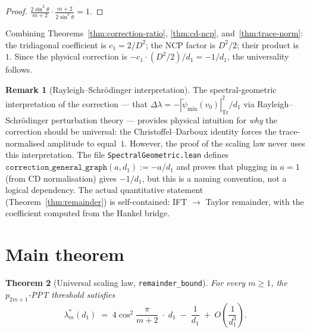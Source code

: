 \documentclass[11pt,a4paper]{article}
\theoremstyle{plain}
\newtheorem{theorem}{Theorem}[section]
\theoremstyle{definition}
\newtheorem{remark}[theorem]{Remark}
\newcommand{\Dsq}{D^2}
\newcommand{\lean}[1]{\texttt{#1}}
\begin{document}
\begin{proof}
$\frac{2\sin^2\theta}{m+2} \cdot \frac{m+2}{2\sin^2\theta} = 1$.
\end{proof}

Combining Theorems~\ref{thm:correction-ratio},
\ref{thm:cd-ncp}, and~\ref{thm:trace-norm}:
the tridiagonal coefficient is $c_1 = 2/\Dsq$;
the NCP factor is $\Dsq/2$;
their product is~$1$.  Since the physical correction is
$-c_1 \cdot (\Dsq/2) / d_1 = -1/d_1$,
the universality follows.

\begin{remark}[Rayleigh--Schr\"odinger interpretation]
\label{rem:RS}
The spectral-geometric interpretation of the correction ---
that $\Delta\lambda = -|\tilde\psi_{\min}(v_0)|^2_{\mathrm{Tr}}/d_1$
via Rayleigh--Schr\"odinger perturbation theory --- provides
physical intuition for \emph{why} the correction should be
universal: the Christoffel--Darboux identity forces the
trace-normalised amplitude to equal~$1$.
However, the proof of the scaling law never uses this
interpretation.  The file \lean{SpectralGeometric.lean}
defines $\lean{correction\_general\_graph}(a, d_1) := -a/d_1$
and proves that plugging in $a = 1$ (from CD normalisation)
gives $-1/d_1$, but this is a naming convention, not a
logical dependency.  The actual quantitative statement
(Theorem~\ref{thm:remainder}) is self-contained:
IFT $\to$ Taylor remainder, with the coefficient
computed from the Hankel bridge.
\end{remark}

\section{Main theorem}
\label{sec:main}

\begin{theorem}[Universal scaling law, \lean{remainder\_bound}]
\label{thm:main}
For every $m \ge 1$, the $p_{2m+1}$-PPT threshold satisfies
\[
  \boxed{\;
  \lambda^*_m(d_1)
  \;=\; 4\cos^2\!\frac{\pi}{m+2} \;\cdot\; d_1
  \;-\; \frac{1}{d_1}
  \;+\; O\!\left(\frac{1}{d_1^3}\right).
  \;}
\]
\end{theorem}
\end{document}
